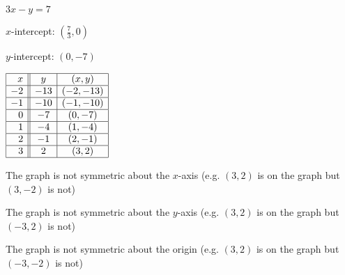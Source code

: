 {$3x - y = 7$}
{$x$-intercept: $(\frac{7}{3}, 0)$  \smallskip

$y$-intercept: $(0, -7)$ \smallskip

$\begin{array}{|r||c|c|}  

\hline
 x &   y & (x,y) \\ \hline
-2 & -13 & (-2,-13) \\  \hline
-1 & -10 & (-1,-10) \\ \hline
 0 &  -7 & (0, -7) \\ \hline
 1 &  -4 & (1, -4) \\ \hline
 2 &  -1 & (2, -1) \\ \hline
 3 &   2 & (3, 2) \\ \hline
 
\end{array} $ \smallskip


\smallskip

The graph is not symmetric about the $x$-axis (e.g. $(3, 2)$ is on the graph but $(3, -2)$ is not) \smallskip

The graph is not symmetric about the $y$-axis (e.g. $(3, 2)$ is on the graph but $(-3, 2)$ is not) \smallskip

The graph is not symmetric about the origin (e.g. $(3, 2)$ is on the graph but $(-3, -2)$ is not)
}
